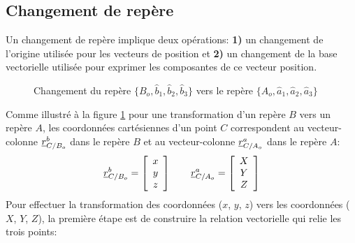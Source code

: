 

\subsection{Changement de repère}
\label{sec:repchan}

Un changement de repère implique deux opérations: \textbf{1)} un changement de l'origine utilisée pour les vecteurs de position et \textbf{2)} un changement de la base vectorielle utilisée pour exprimer les composantes de ce vecteur position.
\begin{figure}[htpb]
	\centering
	\hspace{10pt}
	\caption{Changement du repère $\{B_o,\hat{b}_1,\hat{b}_2,\hat{b}_3\}$ vers  le repère $\{A_o,\hat{a}_1,\hat{a}_2,\hat{a}_3\}$}
	\label{fig:repcha}
\end{figure}
Comme illustré à la figure \ref{fig:repcha} pour une transformation d'un repère $B$ vers un repère $A$, les coordonnées cartésiennes d'un point $C$ correspondent au vecteur-colonne $\underline{r}_{C/B_o}^b$ dans le repère $B$ et au vecteur-colonne $\underline{r}_{C/A_o}^a$ dans le repère $A$:
\begin{align}
	\underline{r}_{C/B_o}^b =
	\left[ \begin{array}{c}
			   x \\ y \\ z
	\end{array} \right]  \quad \quad
	\underline{r}_{C/A_o}^a =
	\left[ \begin{array}{c}
			   X \\ Y \\ Z
	\end{array} \right]
\end{align}
Pour effectuer la transformation des coordonnées ($x$, $y$, $z$) vers les coordonnées ($X$, $Y$, $Z$), la première étape est de construire la relation vectorielle qui relie les trois points:

